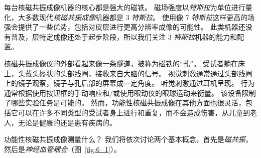 每台核磁共振成像机器的核心都是强大的磁铁。
磁场强度以\textit{特斯拉}为单位进行量化，大多数现代\textit{核磁共振成像}机器都是 3 \textit{特斯拉}。
使用像 7 \textit{特斯拉}这样更高的场强会提供了一些优势，包括对皮层进行更高分辨率成像的可能性。
此类机器还没有普及，层特定成像还处于起步阶段，所以我们关注 3 \textit{特斯拉}机器的能力和配置。


核磁共振成像仪的外部看起来像一条隧道，被称为磁铁的“孔”。
受试者躺在床上，头戴头盔状的头部线圈，接收来自大脑的信号。
视觉刺激通常通过头部线圈上的镜子观察，镜子与孔后部的屏幕成一定角度。
听觉刺激通过耳机呈现。
行为通常根据使用按钮框的手动响应和/或使用眼动仪的眼球运动来衡量。
该设备限制了哪些实验任务是可能的。
然而，功能性核磁共振成像在其他方面也很灵活，包括它可以在许多不同类型的受试者身上进行和重复，而不会造成伤害，从儿童到老人，无论是健康的还是患有疾病的。


功能性核磁共振成像测量什么？
我们将依次讨论两个基本概念，首先是\textit{磁共振}，然后是\textit{神经血管耦合}（图~\ref{fig:6_1}）。


